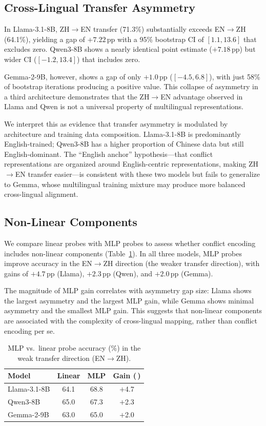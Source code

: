 \documentclass[11pt]{article}
\newcommand{\pp}{\,\text{pp}}
\begin{document}
\subsection{Cross-Lingual Transfer Asymmetry}
\label{sec:asymmetry}

In Llama-3.1-8B, ZH$\to$EN transfer (71.3\%) substantially exceeds EN$\to$ZH (64.1\%), yielding a gap of $+7.22\pp$ with a 95\% bootstrap CI of $[1.1, 13.6]$ that excludes zero.
Qwen3-8B shows a nearly identical point estimate ($+7.18\pp$) but wider CI ($[-1.2, 13.4]$) that includes zero.

Gemma-2-9B, however, shows a gap of only $+1.0\pp$ ($[-4.5, 6.8]$), with just 58\% of bootstrap iterations producing a positive value.
This collapse of asymmetry in a third architecture demonstrates that the ZH$\to$EN advantage observed in Llama and Qwen is not a universal property of multilingual representations.

We interpret this as evidence that transfer asymmetry is modulated by architecture and training data composition.
Llama-3.1-8B is predominantly English-trained; Qwen3-8B has a higher proportion of Chinese data but still English-dominant.
The ``English anchor'' hypothesis---that conflict representations are organized around English-centric representations, making ZH$\to$EN transfer easier---is consistent with these two models but fails to generalize to Gemma, whose multilingual training mixture may produce more balanced cross-lingual alignment.

\subsection{Non-Linear Components}
\label{sec:nonlinear}

We compare linear probes with MLP probes to assess whether conflict encoding includes non-linear components (Table~\ref{tab:mlp}).
In all three models, MLP probes improve accuracy in the EN$\to$ZH direction (the weaker transfer direction), with gains of $+4.7\pp$ (Llama), $+2.3\pp$ (Qwen), and $+2.0\pp$ (Gemma).

The magnitude of MLP gain correlates with asymmetry gap size: Llama shows the largest asymmetry and the largest MLP gain, while Gemma shows minimal asymmetry and the smallest MLP gain.
This suggests that non-linear components are associated with the complexity of cross-lingual mapping, rather than conflict encoding per se.

\begin{table}[t]
\centering
\caption{MLP vs.\ linear probe accuracy (\%) in the weak transfer direction (EN$\to$ZH).}
\label{tab:mlp}
\begin{tabular}{lccc}
\toprule
Model & Linear & MLP & Gain (\pp) \\
\midrule
Llama-3.1-8B & 64.1 & 68.8 & $+$4.7 \\
Qwen3-8B     & 65.0 & 67.3 & $+$2.3 \\
Gemma-2-9B   & 63.0 & 65.0 & $+$2.0 \\
\bottomrule
\end{tabular}
\end{table}
\end{document}
